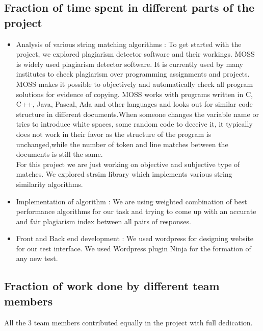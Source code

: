 \subsection{Fraction of time spent in different parts of the project}

\begin{itemize}
    \item Analysis of various string matching algorithms : To get started with the project, we explored plagiarism detector software and their workings. MOSS is widely used plagiarism detector software. It is currently used by many institutes to check plagiarism over programming assignments and projects.  \\
    MOSS\cite{moss} makes it possible to objectively and automatically check all program
solutions for evidence of copying. MOSS works with programs written in C, C++, Java, Pascal, Ada and other languages and looks out for similar code structure in different documents.When someone changes the variable name or tries to introduce white spaces, some random code to deceive it, it typically does not work in their favor as the structure of the program is unchanged,while the number of token and line matches between the documents is still the same. \\
For this project we are just working on objective and subjective type of matches. We explored strsim library which implements various string similarity algorithms.
    \item Implementation of algorithm : We are using weighted combination of best performance algorithms for our task and trying to come up with an accurate and fair plagiarism index between all pairs of responses.
    \item Front and Back end development : We used wordpress for designing website for our test interface. We used Wordpress plugin Ninja for the formation of any new test.
\end{itemize}


\subsection{Fraction of work done by different team members}       
All the 3 team members contributed equally in the project with full dedication.